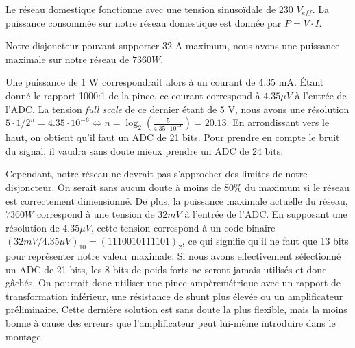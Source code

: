 \documentclass{../../template/tp}
\begin{document}
{
	Le réseau domestique fonctionne avec une tension sinusoïdale de 230 $V_{eff}$.
	La puissance consommée sur notre réseau domestique est donnée par $P = V \cdot I$.

	Notre disjoncteur pouvant supporter 32 A maximum, nous avons une puissance maximale sur notre réseau de $7360 W$.

	Une puissance de 1 W correspondrait alors à un courant de 4.35 mA. Étant donné le rapport 1000:1 de la pince, ce courant correspond à $4.35\mu V$ à l'entrée de l'ADC.
	La tension \textit{full scale} de ce dernier étant de 5 V, nous avons une résolution $5 \cdot 1/2^n = 4.35 \cdot 10^{-6} \Leftrightarrow  n = \log_2(\frac{5}{4.35 \cdot 10^{-6}}) = 20.13$. En arrondissant vers le haut, on obtient qu'il faut un ADC de 21 bits. Pour prendre en compte le bruit du signal, il vaudra sans doute mieux prendre un ADC de 24 bits.

	Cependant, notre réseau ne devrait pas s'approcher des limites de notre disjoncteur. On serait sans aucun doute à moins de 80\% du maximum si le réseau est correctement dimensionné.
	De plus, la puissance maximale actuelle du réseau, $7360 W$ correspond à une tension de $32 mV$ à l'entrée de l'ADC. En supposant une résolution de $4.35\mu V$, cette tension correspond à un code binaire $(32 mV/4.35\mu V)_{10} = (1110010111101)_2$, ce qui signifie qu'il ne faut que 13 bits pour représenter notre valeur maximale. Si nous avons effectivement sélectionné un ADC de 21 bits, les 8 bits de poids forts ne seront jamais utilisés et donc gâchés.
	On pourrait donc utiliser une pince ampèremétrique avec un rapport de transformation inférieur, une résistance de shunt plus élevée ou un amplificateur préliminaire. Cette dernière solution est sans doute la plus flexible, mais la moins bonne à cause des erreurs que l'amplificateur peut lui-même introduire dans le montage.
}
\end{document}

